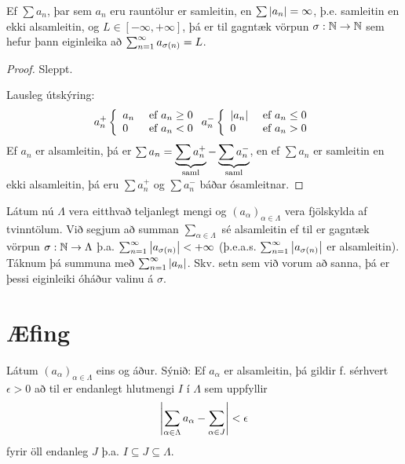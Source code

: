 \documentclass[12pt]{report}
\begin{document}
\begin{setn}
  Ef $\sum a_n$, þar sem $a_n$ eru rauntölur er samleitin, en
  $\sum \left|a_n\right| = \infty$, þ.e.  samleitin en ekki alsamleitin, og
  $L \in [-\infty, +\infty]$, þá er til gagntæk vörpun
  $\sigma: \mathbb{N} \to \mathbb{N}$ sem hefur þann eiginleika að
  $\sum_{n = 1}^{\infty} a_{\sigma(n)} = L$.
\end{setn}
\begin{proof} Sleppt.

  Lausleg útskýring:
  \[a_n^+ \left\{ \begin{array}{l l} a_n & \text{ ef } a_n \geq 0 \\ 0 & \text{ ef } a_n < 0 \end{array} \right.
  a_n^- \left\{ \begin{array}{l l} \left|a_n\right| & \text{ ef } a_n \leq 0 \\ 0 & \text{ ef } a_n > 0
  \end{array} \right.
  \]
  Ef $a_n$ er alsamleitin, þá er
  $\sum a_n = \underbrace{\sum a_n^+}_{\text{saml}} - \underbrace{\sum a_n^-}_{\text{saml}}$, en ef
  $\sum a_n$ er samleitin en ekki alsamleitin, þá eru $\sum a_n^+$ og
  $\sum a_n^-$ báðar ósamleitnar.

\end{proof}

Látum nú $\Lambda$ vera eitthvað teljanlegt mengi og
$(a_{\alpha})_{\alpha \in \Lambda}$ vera fjölskylda af tvinntölum. Við
segjum að summan $\sum_{\alpha \in \Lambda}$ sé alsamleitin ef til er
gagntæk vörpun $\sigma: \mathbb{N} \to \Lambda$ þ.a.
$\sum_{n = 1}^{\infty} \left|a_{\sigma(n)}\right| < +\infty$ (þ.e.a.s.
$\sum_{n = 1}^{\infty} \left|a_{\sigma(n)}\right|$ er alsamleitin). Táknum þá summuna
með $\sum_{n = 1}^{\infty} \left|a_n\right|$. Skv. setn sem við vorum að sanna, þá er
þessi eiginleiki óháður valinu á $\sigma$.


\section*{Æfing}

Látum $(a_{\alpha})_{\alpha \in \Lambda}$ eins og áður. Sýnið: Ef
$a_{\alpha}$ er alsamleitin, þá gildir f. sérhvert $\epsilon > 0$ að
til er endanlegt hlutmengi $I$ í $\Lambda$ sem uppfyllir
\[ \left|\sum_{\alpha \in \Lambda} a_{\alpha} - \sum_{\alpha \in J} \right| <
\epsilon \]
fyrir öll endanleg $J$ þ.a. $I \subseteq J \subseteq \Lambda $.
\end{document}
